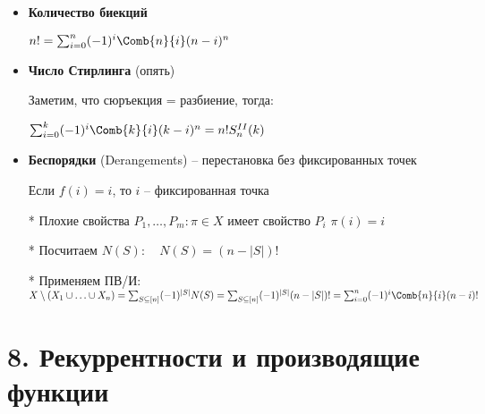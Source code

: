 \documentclass[12pt]{article}
\begin{document}
\begin{itemize}
        \item \textbf{Количество биекций}

        $n! = \sum_{i=0}^n (-1)^i \Comb{n}{i} (n - i)^n$

        \item \textbf{Число Стирлинга} (опять)

        Заметим, что сюръекция = разбиение, тогда:

        $\sum^k_{i = 0} (-1)^{i} \Comb{k}{i} (k - i)^n = n! S^{II}_n (k)$

        \mediumvspace

        \item \textbf{Беспорядки} (Derangements) -- перестановка без фиксированных точек

        Если $f(i) = i$, то $i$ -- фиксированная точка

        * Плохие свойства $P_1,\dots,P_m : \pi \in X$ имеет свойство $P_i$ \Longleftrightarrow $\pi(i) = i$

        * Посчитаем $N(S): \quad N(S) = (n - |S|)!$

        * Применяем ПВ/И: $X \setminus (X_1 \union \dots \union X_n) = \sum_{S \subseteq [n]} (-1)^{|S|} N(S) =
        \sum_{S \subseteq [n]} (-1)^{|S|} (n - |S|)! = \sum_{i = 0}^n (-1)^{i} \Comb{n}{i} (n - i)!$

    \end{itemize}

    \clearpage


    \section{8. Рекуррентности и производящие функции}
\end{document}

